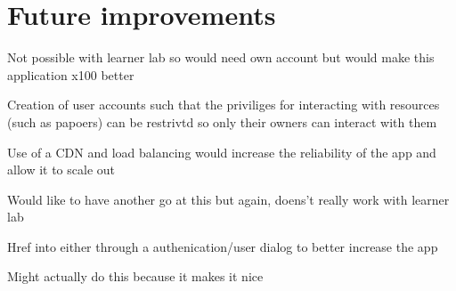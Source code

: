 \documentclass[12pt]{article}
\begin{document}

\section*{Future improvements}

Not possible with learner lab so would need own account but would make this application x100 better

Creation of user accounts such that the priviliges for interacting with resources (such as papoers) can be restrivtd so only their owners can interact with them

Use of a CDN and load balancing would increase the reliability of the app and allow it to scale out 

Would like to have another go at this but again, doens't really work with learner lab

Href into either through a authenication/user dialog to better increase the app 

Might actually do this because it makes it nice
\end{document}

